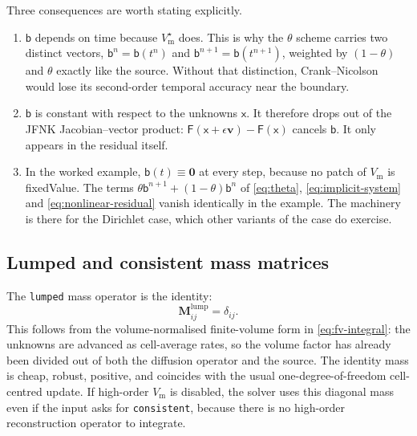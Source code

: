 \documentclass[11pt,a4paper]{article}
\newcommand{\code}[1]{\texttt{\small #1}}
\newcommand{\Vm}{V_{\text{m}}}
\newcommand{\Mmass}{\mathbf{M}}
\newcommand{\Fres}{\mathsf{F}}
\begin{document}
Three consequences are worth stating explicitly.
\begin{enumerate}
\item $\mathsf{b}$ depends on time because $\Vm^\star$ does. This is why the
$\theta$ scheme carries two distinct vectors, $\mathsf{b}^n=\mathsf{b}(t^n)$ and
$\mathsf{b}^{n+1}=\mathsf{b}(t^{n+1})$, weighted by $(1-\theta)$ and $\theta$
exactly like the source. Without that distinction, Crank--Nicolson would lose
its second-order temporal accuracy near the boundary.
\item $\mathsf{b}$ is constant with respect to the unknowns $\mathsf{x}$. It
therefore drops out of the JFNK Jacobian--vector product:
$\Fres(\mathsf{x}+\epsilon\mathbf{v})-\Fres(\mathsf{x})$ cancels $\mathsf{b}$.
It only appears in the residual itself.
\item In the worked example, $\mathsf{b}(t)\equiv\mathbf{0}$ at every step, because no patch of $V_\text{m}$ is fixedValue. The terms $\theta\mathsf{b}^{n+1}+(1-\theta)\mathsf{b}^{n}$ of \eqref{eq:theta}, \eqref{eq:implicit-system} and \eqref{eq:nonlinear-residual} vanish identically in the example. The machinery is there for the Dirichlet case, which other variants of the case do exercise.
\end{enumerate}

\subsection{Lumped and consistent mass matrices}

The \code{lumped} mass operator is the identity:
\begin{equation}
  \Mmass^{\mathrm{lump}}_{ij}
  =
  \delta_{ij}.
  \label{eq:lumped}
\end{equation}
This follows from the volume-normalised finite-volume form in
\eqref{eq:fv-integral}: the unknowns are advanced as cell-average rates, so
the volume factor has already been divided out of both the diffusion operator
and the source. The identity mass is cheap, robust, positive, and coincides
with the usual one-degree-of-freedom cell-centred update. If high-order $\Vm$
is disabled, the solver uses this diagonal mass even if the input asks for
\code{consistent}, because there is no high-order reconstruction operator to
integrate.
\end{document}
